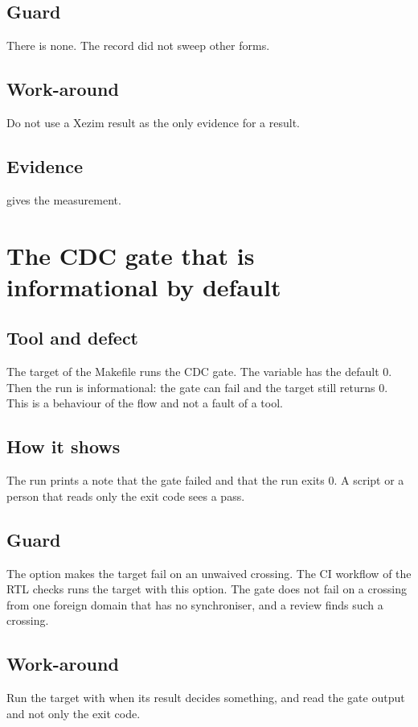 \subsection*{Guard}
There is none. The record did not sweep other forms.

\subsection*{Work-around}
Do not use a Xezim result as the only evidence for a result.

\subsection*{Evidence}
 gives the measurement.

\section{The CDC gate that is informational by default}\label{tm:defect:cdc-gate-informational}
\subsection*{Tool and defect}
The target  of the  Makefile runs the CDC gate. The variable  has the default 0. Then the run is informational: the gate can fail and the target still returns 0. This is a behaviour of the flow and not a fault of a tool.

\subsection*{How it shows}
The run prints a note that the gate failed and that the run exits 0. A script or a person that reads only the exit code sees a pass.

\subsection*{Guard}
The option  makes the target fail on an unwaived crossing. The CI workflow of the RTL checks runs the target with this option. The gate does not fail on a crossing from one foreign domain that has no synchroniser, and a review finds such a crossing.

\subsection*{Work-around}
Run the target with  when its result decides something, and read the gate output and not only the exit code.

